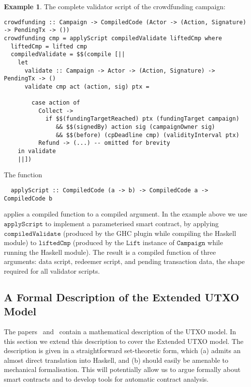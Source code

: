 \documentclass[a4paper]{article}
\theoremstyle{definition}  %
\newtheorem{example}{Example}
\begin{document}
\begin{example}



The complete validator script of the crowdfunding campaign:

\begin{verbatim}
crowdfunding :: Campaign -> CompiledCode (Actor -> (Action, Signature) -> PendingTx -> ())
crowdfunding cmp = applyScript compiledValidate liftedCmp where
  liftedCmp = lifted cmp
  compiledValidate = $$(compile [|| 
    let 
      validate :: Campaign -> Actor -> (Action, Signature) -> PendingTx -> ()
      validate cmp act (action, sig) ptx =

        case action of
          Collect -> 
            if $$(fundingTargetReached) ptx (fundingTarget campaign)
               && $$(signedBy) action sig (campaignOwner sig)
               && $$(before) (cpDeadline cmp) (validityInterval ptx) 
          Refund -> (...) -- omitted for brevity
    in validate
    ||])
\end{verbatim}

The function

\begin{verbatim}
  applyScript :: CompiledCode (a -> b) -> CompiledCode a -> CompiledCode b
\end{verbatim}

applies a compiled function to a compiled argument. In the example above we use $\mathtt{applyScript}$ to implement a parameterised smart contract, by applying $\mathtt{compiledValidate}$ (produced by the GHC plugin while compiling the Haskell module) to $\mathtt{liftedCmp}$ (produced by the $\mathtt{Lift}$ instance of $\mathtt{Campaign}$ while running the Haskell module). The result is a compiled function of three arguments: data script, redeemer script, and pending transaction data, the shape required for all validator scripts.

\end{example}


\subsection{A Formal Description of the Extended UTXO Model}
\label{subsection:extended-utxo}
The papers~\cite{Zahnentferner18-UTxO}
and~\cite{Zahnentferner18-Chimeric} contain a mathematical description
of the UTXO model. In this section we extend this description to cover
the Extended UTXO model.  The description is given in a
straightforward set-theoretic form, which (a) admits an almost direct
translation into Haskell, and (b) should easily be amenable to
mechanical formalisation.  This will potentially allow us to argue
formally about smart contracts and to develop tools for automatic
contract analysis.
\end{document}
